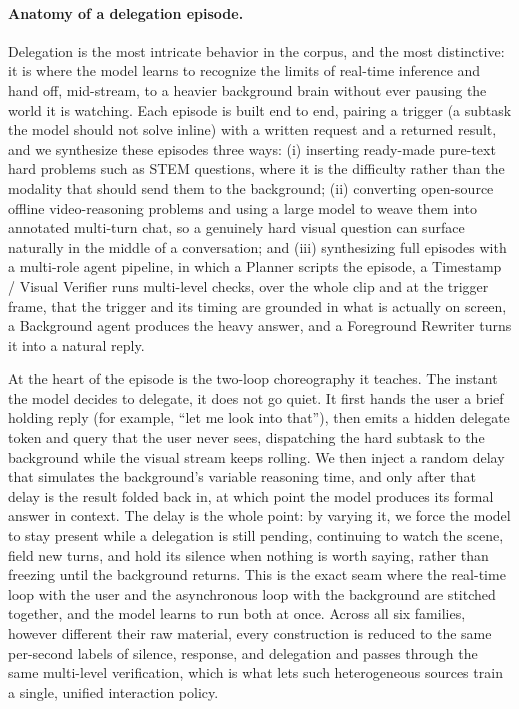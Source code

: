 \paragraph{\textbf{Anatomy of a delegation episode.}}
Delegation is the most intricate behavior in the corpus, and the most distinctive: it is where the model learns to recognize the limits of real-time inference and hand off, mid-stream, to a heavier background brain without ever pausing the world it is watching. Each episode is built end to end, pairing a trigger (a subtask the model should not solve inline) with a written request and a returned result, and we synthesize these episodes three ways: (i) inserting ready-made pure-text hard problems such as STEM questions, where it is the difficulty rather than the modality that should send them to the background; (ii) converting open-source offline video-reasoning problems and using a large model to weave them into annotated multi-turn chat, so a genuinely hard visual question can surface naturally in the middle of a conversation; and (iii) synthesizing full episodes with a multi-role agent pipeline, in which a Planner scripts the episode, a Timestamp / Visual Verifier runs multi-level checks, over the whole clip and at the trigger frame, that the trigger and its timing are grounded in what is actually on screen, a Background agent produces the heavy answer, and a Foreground Rewriter turns it into a natural reply.


At the heart of the episode is the two-loop choreography it teaches. The instant the model decides to delegate, it does not go quiet. It first hands the user a brief holding reply (for example, ``let me look into that''), then emits a hidden delegate token and query that the user never sees, dispatching the hard subtask to the background while the visual stream keeps rolling. We then inject a random delay that simulates the background's variable reasoning time, and only after that delay is the result folded back in, at which point the model produces its formal answer in context. The delay is the whole point: by varying it, we force the model to stay present while a delegation is still pending, continuing to watch the scene, field new turns, and hold its silence when nothing is worth saying, rather than freezing until the background returns. This is the exact seam where the real-time loop with the user and the asynchronous loop with the background are stitched together, and the model learns to run both at once. Across all six families, however different their raw material, every construction is reduced to the same per-second labels of silence, response, and delegation and passes through the same multi-level verification, which is what lets such heterogeneous sources train a single, unified interaction policy.

